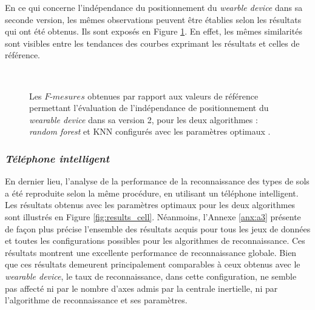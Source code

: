 En ce qui concerne l'indépendance du positionnement du \textit{wearble device} dans sa seconde version, les mêmes observations peuvent être établies selon les résultats qui ont été obtenus. Ils sont exposés en Figure \ref{fig:pos_ind_wear_v2}. En effet, les mêmes similarités sont visibles entre les tendances des courbes exprimant les résultats et celles de référence.

\begin{figure}[H]
    \centering
    \\[20pt]
    \caption[Les $F\mbox{-} mesures$ obtenues par rapport aux valeurs de référence permettant l'évaluation de l'indépendance de positionnement du \textit{wearable device} dans sa version 2, pour les deux algorithmes : \textit{random forest} et \acs{KNN} configurés avec les paramètres optimaux.]{Les $F\mbox{-} mesures$ obtenues par rapport aux valeurs de référence permettant l'évaluation de l'indépendance de positionnement du \textit{wearable device} dans sa version 2, pour les deux algorithmes : \textit{random forest} et \acs{KNN} configurés avec les paramètres optimaux \citep{Thullier2017}.}
    \label{fig:pos_ind_wear_v2}
\end{figure}

\subsubsection{\textit{Téléphone intelligent}}

En dernier lieu, l'analyse de la performance de la reconnaissance des types de sols a été reproduite selon la même procédure, en utilisant un téléphone intelligent. Les résultats obtenus avec les paramètres optimaux pour les deux algorithmes sont illustrés en Figure \ref{fig:results_cell}. Néanmoins, l'Annexe \ref{anx:a3} présente de façon plus précise l'ensemble des résultats acquis pour tous les jeux de données et toutes les configurations possibles pour les algorithmes de reconnaissance. Ces résultats montrent une excellente performance de reconnaissance globale. Bien que ces résultats demeurent principalement comparables à ceux obtenus avec le \textit{wearable device}, le taux de reconnaissance, dans cette configuration, ne semble pas affecté ni par le nombre d'axes admis par la centrale inertielle, ni par l'algorithme de reconnaissance et ses paramètres.

